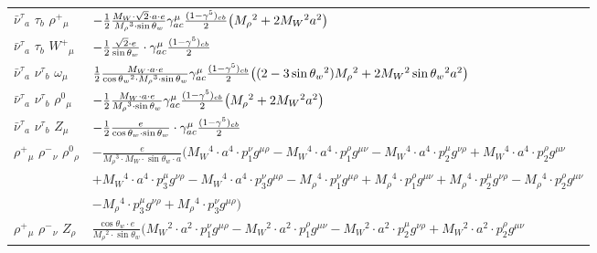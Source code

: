 \begin{center}
\begin{tabular}{|l|l|}
$\bar{\nu}^\tau{}_{a }$ \phantom{-} $\tau{}_{b }$ \phantom{-} $\rho^+{}_{\mu }$ \phantom{-}  &
	$-\frac{1}{2}\frac{ M_W \cdot\sqrt{2} \cdot a \cdot e}{ M_\rho{}^3  \cdot \sin{\theta}_w}\gamma_{a c}^\mu {(1-\gamma^5)_{c b}\over 2} \big( M_\rho{}^2 +2 M_W{}^2  a{}^2 \big)$\\[2mm]
$\bar{\nu}^\tau{}_{a }$ \phantom{-} $\tau{}_{b }$ \phantom{-} $W^+{}_{\mu }$ \phantom{-}  &
	$-\frac{1}{2}\frac{\sqrt{2} \cdot e}{ \sin{\theta}_w}\cdot \gamma_{a c}^\mu {(1-\gamma^5)_{c b}\over 2} $\\[2mm]
$\bar{\nu}^\tau{}_{a }$ \phantom{-} $\nu^\tau{}_{b }$ \phantom{-} $\omega{}_{\mu }$ \phantom{-}  &
	$\frac{1}{2}\frac{ M_W \cdot a \cdot e}{ \cos{\theta}_w{}^2  \cdot M_\rho{}^3  \cdot \sin{\theta}_w}\gamma_{a c}^\mu {(1-\gamma^5)_{c b}\over 2} \big( (2-3 \sin{\theta}_w {}^2) M_\rho{}^2 +2 M_W{}^2  \sin{\theta}_w{}^2  a{}^2 \big)$\\[2mm]
$\bar{\nu}^\tau{}_{a }$ \phantom{-} $\nu^\tau{}_{b }$ \phantom{-} $\rho^0{}_{\mu }$ \phantom{-}  &
	$-\frac{1}{2}\frac{ M_W \cdot a \cdot e}{ M_\rho{}^3  \cdot \sin{\theta}_w}\gamma_{a c}^\mu {(1-\gamma^5)_{c b}\over 2} \big( M_\rho{}^2 +2 M_W{}^2  a{}^2 \big)$\\[2mm]
$\bar{\nu}^\tau{}_{a }$ \phantom{-} $\nu^\tau{}_{b }$ \phantom{-} ${Z}_{\mu }$ \phantom{-}  &
	$-\frac{1}{2}\frac{ e}{ \cos{\theta}_w \cdot \sin{\theta}_w}\cdot \gamma_{a c}^\mu {(1-\gamma^5)_{c b}\over 2} $\\[2mm]
$\rho^+{}_{\mu }$ \phantom{-} $\rho^-{}_{\nu }$ \phantom{-} $\rho^0{}_{\rho }$ \phantom{-}  &
	$-\frac{ e}{ M_\rho{}^3  \cdot M_W \cdot \sin{\theta}_w \cdot a}\big( M_W{}^4 \cdot  a{}^4 \cdot p_1^\nu g^{\mu \rho} - M_W{}^4 \cdot  a{}^4 \cdot p_1^\rho g^{\mu \nu} - M_W{}^4 \cdot  a{}^4 \cdot p_2^\mu g^{\nu \rho} + M_W{}^4 \cdot  a{}^4 \cdot p_2^\rho g^{\mu \nu} $ \\[2mm]
  & $+ M_W{}^4 \cdot  a{}^4 \cdot p_3^\mu g^{\nu \rho} - M_W{}^4 \cdot  a{}^4 \cdot p_3^\nu g^{\mu \rho} - M_\rho{}^4 \cdot p_1^\nu g^{\mu \rho} + M_\rho{}^4 \cdot p_1^\rho g^{\mu \nu} + M_\rho{}^4 \cdot p_2^\mu g^{\nu \rho} - M_\rho{}^4 \cdot p_2^\rho g^{\mu \nu} $ \\[2mm]
  & $- M_\rho{}^4 \cdot p_3^\mu g^{\nu \rho} + M_\rho{}^4 \cdot p_3^\nu g^{\mu \rho} \big)$\\[2mm]
$\rho^+{}_{\mu }$ \phantom{-} $\rho^-{}_{\nu }$ \phantom{-} ${Z}_{\rho }$ \phantom{-}  &
	$\frac{ \cos{\theta}_w \cdot e}{ M_\rho{}^2  \cdot \sin{\theta}_w}\big( M_W{}^2 \cdot  a{}^2 \cdot p_1^\nu g^{\mu \rho} - M_W{}^2 \cdot  a{}^2 \cdot p_1^\rho g^{\mu \nu} - M_W{}^2 \cdot  a{}^2 \cdot p_2^\mu g^{\nu \rho} + M_W{}^2 \cdot  a{}^2 \cdot p_2^\rho g^{\mu \nu} $ \\[2mm]

\end{tabular}
\end{center}
